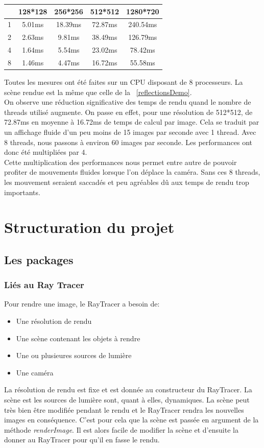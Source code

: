 \documentclass[11pt]{article}
\begin{document}
\begin{center}
	\begin{tabular}{|c|c|c|c|c|}
		\hline
		\backslashbox{Nombre de thread}{Résolution de rendu} & 128*128 & 256*256 & 512*512 & 1280*720\\
		\hline
		1 & 5.01ms & 18.39ms & 72.87ms & 240.54ms\\
		2 & 2.63ms & 9.81ms & 38.49ms & 126.79ms\\
		4 & 1.64ms & 5.54ms & 23.02ms & 78.42ms\\
		8 & 1.46ms & 4.47ms & 16.72ms & 55.58ms\\
		\hline
	\end{tabular}
\end{center}
Toutes les mesures ont été faites sur un CPU disposant de 8 processeurs. La scène rendue est la même que celle de la \figurename\ \ref{reflectionsDemo}.\\
On observe une réduction significative des temps de rendu quand le nombre de threads utilisé augmente. On passe en effet, pour une résolution de 512*512, de 72.87ms en moyenne à 16.72ms de temps de calcul par image. Cela se traduit par un affichage fluide d'un peu moins de 15 images par seconde avec 1 thread. Avec 8 threads, nous passons à environ 60 images par seconde. Les performances ont donc été multipliées par 4.\\
Cette multiplication des performances nous permet entre autre de pouvoir profiter de mouvements fluides lorsque l'on déplace la caméra. Sans ces 8 threads, les mouvement seraient saccadés et peu agréables dû aux temps de rendu trop importants.


\section{Structuration du projet}
\subsection{Les packages}
\subsubsection{Liés au Ray Tracer}

Pour rendre une image, le RayTracer a besoin de:
\begin{itemize}
	\item{Une résolution de rendu}
	\item{Une scène contenant les objets à rendre}
	\item{Une ou plusieures sources de lumière}
	\item{Une caméra}
\end{itemize}
La résolution de rendu est fixe et est donnée au constructeur du RayTracer. La scène est les sources de lumière sont, quant à elles, dynamiques. La scène peut très bien être modifiée pendant le rendu et le RayTracer rendra les nouvelles images en conséquence. C'est pour cela que la scène est passée en argument de la méthode \textit{renderImage}. Il est alors facile de modifier la scène et d'ensuite la donner au RayTracer pour qu'il en fasse le rendu.
\end{document}
